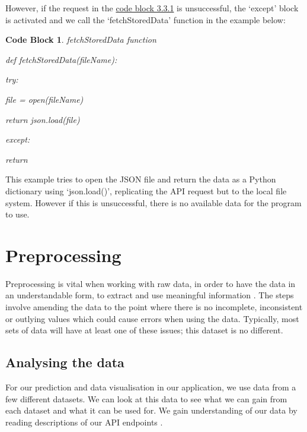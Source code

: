 \documentclass[12pt, a4paper, oneside]{book}
\newtheorem{codeblock}[theorem]{Code Block}
\numberwithin{equation}{section}
\begin{document}
However, if the request in the \hyperref[fetchData function]{code block 3.3.1} is unsuccessful, the `except' block is activated
and we call the `fetchStoredData' function in the example below:

\begin{codeblock} \label{fetchStoredData function}
  fetchStoredData function

  def fetchStoredData(fileName):

  try:

  \hspace{\parindent} file = open(fileName)

  \hspace{\parindent} return json.load(file)

  except:

  \hspace{\parindent} return {}
\end{codeblock}

This example tries to open the JSON file and return the data as a Python dictionary
using `json.load()', replicating the API request but to the local file system. However if this is
unsuccessful, there is no available data for the program to use.


\chapter{Preprocessing}\label{ch:4}

Preprocessing is vital when working with raw data, in order to have the data in an
understandable form, to extract and use meaningful information \cite{Preprocessing definition}. The steps involve
amending the data to the point where there is no incomplete, inconsistent or outlying values
which could cause errors when using the data. Typically, most sets of data will have at least
one of these issues; this dataset is no different.

\section{Analysing the data}\label{sec:4.1}

For our prediction and data visualisation in our application, we use data from a few different datasets. We can look at this data to see what we can gain from each dataset and what it can be used for. We gain understanding of our data by reading descriptions of our API endpoints \cite{API Endpoints}.

\vspace{0.5cm}
\end{document}

